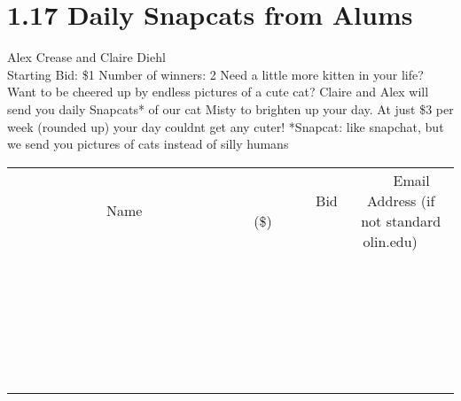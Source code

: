 \documentclass[11pt]{article}
\begin{document}
\section*{1.17 Daily Snapcats from Alums}
Alex Crease and Claire Diehl
\\
Starting Bid: \$1
\newline
Number of winners: 2
\newline
Need a little more kitten in your life? Want to be cheered up by endless pictures of a cute cat? Claire and Alex will send you daily Snapcats* of our cat Misty to brighten up your day. At just \$3 per week (rounded up) your day couldnt get any cuter!
*Snapcat: like snapchat, but we send you pictures of cats instead of silly humans
\\[6ex]
\begin{tabular}{c c c}
~~~~~~~~~~~~~Name~~~~~~~~~~~~~ & ~~~~~~~~~Bid (\$)~~~~~~~~~  & ~~~Email Address (if not standard olin.edu)~~~\\
 & & \\
\hline
 & & \\
\hline
 & & \\
\hline
 & & \\
\hline
 & & \\
\hline
 & & \\
\hline
 & & \\
\hline
 & & \\
\hline
 & & \\
\hline
 & & \\
\hline
 & & \\
\hline
 & & \\
\hline
 & & \\
\hline
 & & \\
\hline
 & & \\
\hline
 & & \\
\hline
 & & \\
\hline
 & & \\
\hline
 & & \\
\hline
 & & \\
\hline
 & & \\
\hline
 & & \\
\hline
 & & \\
\hline
 & & \\
\hline
 & & \\
\hline
 & & \\
\hline
\end{tabular}
\newpage
\end{document}
